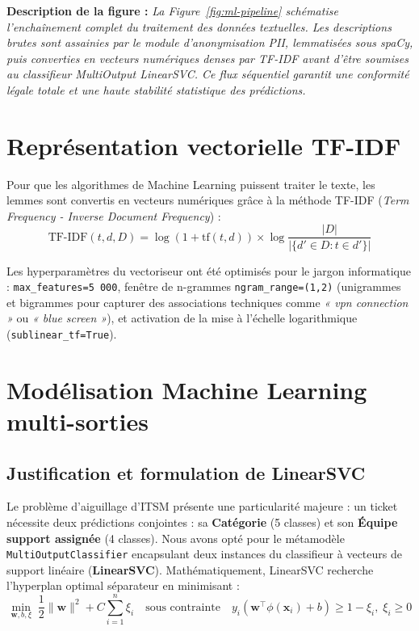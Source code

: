 \documentclass[12pt, a4paper, oneside]{report}
\begin{document}
\noindent\small\textbf{Description de la figure :} \textit{La Figure~\ref{fig:ml-pipeline} schématise l'enchaînement complet du traitement des données textuelles. Les descriptions brutes sont assainies par le module d'anonymisation PII, lemmatisées sous spaCy, puis converties en vecteurs numériques denses par TF-IDF avant d'être soumises au classifieur MultiOutput LinearSVC. Ce flux séquentiel garantit une conformité légale totale et une haute stabilité statistique des prédictions.}

\section{Représentation vectorielle TF-IDF}

Pour que les algorithmes de Machine Learning puissent traiter le texte, les lemmes sont convertis en vecteurs numériques grâce à la méthode TF-IDF (\textit{Term Frequency - Inverse Document Frequency}) :
\begin{equation}
  \text{TF-IDF}(t, d, D) = \log(1 + \text{tf}(t,d)) \times \log\frac{|D|}{|\{d' \in D : t \in d'\}|}
\end{equation}

Les hyperparamètres du vectoriseur ont été optimisés pour le jargon informatique : \texttt{max\_features=5\,000}, fenêtre de n-grammes \texttt{ngram\_range=(1,2)} (unigrammes et bigrammes pour capturer des associations techniques comme \textit{« vpn connection »} ou \textit{« blue screen »}), et activation de la mise à l'échelle logarithmique (\texttt{sublinear\_tf=True}).

\section{Modélisation Machine Learning multi-sorties}

\subsection{Justification et formulation de LinearSVC}

Le problème d'aiguillage d'ITSM présente une particularité majeure : un ticket nécessite deux prédictions conjointes : sa \textbf{Catégorie} (5 classes) et son \textbf{Équipe support assignée} (4 classes). Nous avons opté pour le métamodèle \texttt{MultiOutputClassifier} encapsulant deux instances du classifieur à vecteurs de support linéaire (\textbf{LinearSVC}). Mathématiquement, LinearSVC recherche l'hyperplan optimal séparateur en minimisant :
\begin{equation}
  \min_{\mathbf{w},b,\xi} \;\frac{1}{2}\|\mathbf{w}\|^2 + C\sum_{i=1}^{n}\xi_i \quad \text{sous contrainte} \quad y_i(\mathbf{w}^\top \phi(\mathbf{x}_i) + b) \geq 1 - \xi_i, \;\xi_i \geq 0
\end{equation}
\end{document}
